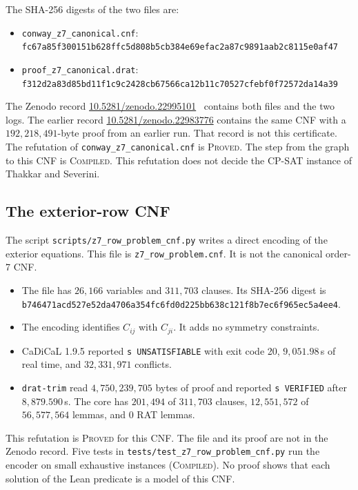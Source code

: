 \documentclass{article}
\theoremstyle{plain}
\theoremstyle{definition}
\numberwithin{equation}{section}
\begin{document}
The SHA-256 digests of the two files are:
\begin{itemize}
 \item \texttt{conway\_z7\_canonical.cnf}:\\
   {\footnotesize\texttt{fc67a85f300151b628ffc5d808b5cb384e69efac2a87c9891aab2c8115e0af47}}
 \item \texttt{proof\_z7\_canonical.drat}:\\
   {\footnotesize\texttt{f312d2a83d85bd11f1c9c2428cb67566ca12b11c70527cfebf0f72572da14a39}}
\end{itemize}
The Zenodo record \href{https://doi.org/10.5281/zenodo.22995101}{10.5281/zenodo.22995101}~\cite{conway99_zenodo} contains both files and the two logs. The earlier record \href{https://doi.org/10.5281/zenodo.22983776}{10.5281/zenodo.22983776} contains the same CNF with a $192{,}218{,}491$-byte proof from an earlier run. That record is not this certificate.
The refutation of \texttt{conway\_z7\_canonical.cnf} is \textsc{Proved}. The step from the graph to this CNF is \textsc{Compiled}. This refutation does not decide the CP-SAT instance of Thakkar and Severini.

\subsection{The exterior-row CNF}
\label{sec:exterior_row}

The script \texttt{scripts/z7\_row\_problem\_cnf.py} writes a direct encoding of the exterior equations. This file is \texttt{z7\_row\_problem.cnf}. It is not the canonical order-7 CNF.
\begin{itemize}
 \item The file has $26{,}166$ variables and $311{,}703$ clauses. Its SHA-256 digest is {\footnotesize\texttt{b746471acd527e52da4706a354fc6fd0d225bb638c121f8b7ec6f965ec5a4ee4}}.
 \item The encoding identifies $C_{ij}$ with $C_{ji}$. It adds no symmetry constraints.
 \item CaDiCaL 1.9.5 reported \texttt{s UNSATISFIABLE} with exit code 20, $9{,}051.98$\,s of real time, and $32{,}331{,}971$ conflicts.
 \item \texttt{drat-trim} read $4{,}750{,}239{,}705$ bytes of proof and reported \texttt{s VERIFIED} after $8{,}879.590$\,s. The core has $201{,}494$ of $311{,}703$ clauses, $12{,}551{,}572$ of $56{,}577{,}564$ lemmas, and 0 RAT lemmas.
\end{itemize}
This refutation is \textsc{Proved} for this CNF. The file and its proof are not in the Zenodo record. Five tests in \texttt{tests/test\_z7\_row\_problem\_cnf.py} run the encoder on small exhaustive instances (\textsc{Compiled}). No proof shows that each solution of the Lean predicate is a model of this CNF.
\end{document}
